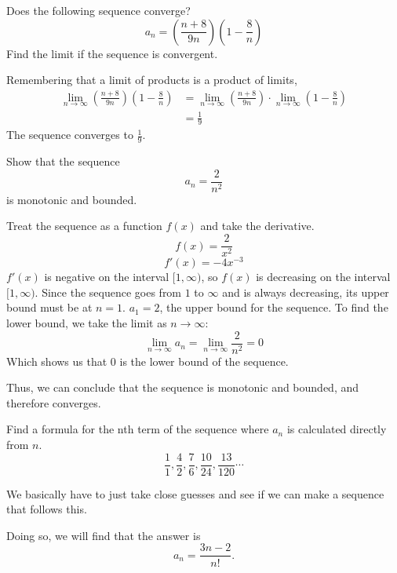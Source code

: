 \begin{ex}
  Does the following sequence converge?
  \[ a_n = \left( \frac{n+8}{9n} \right) \left( 1-\frac{8}{n} \right) \]
  Find the limit if the sequence is convergent.
  \begin{sol}
    Remembering that a limit of products is a product of limits,
    \begin{align*}
      \lim_{n \to \infty} \left( \frac{n+8}{9n} \right) \left( 1-\frac{8}{n} \right)
      &= \lim_{n \to \infty} \left( \frac{n+8}{9n} \right) \cdot
      \lim_{n \to \infty} \left( 1-\frac{8}{n} \right)\\
      &= \frac{1}{9}
    \end{align*}
    The sequence converges to \(\frac{1}{9} \).
  \end{sol}
\end{ex}
\begin{ex}
  Show that the sequence \[a_n = \frac{2}{n^2} \] is monotonic and bounded.
  \begin{sol}
    Treat the sequence as a function $f(x)$ and take the derivative.
    \[ f(x) = \frac{2}{x^2} \]
    \[ f'(x) = -4 x^{-3} \]
    $f'(x)$ is negative on the interval $[1, \infty)$, so $f(x)$ is decreasing
      on the interval $[1, \infty)$. Since the sequence goes from $1$ to
        $\infty$ and is always decreasing, its upper bound must be at $n=1$.
        $a_1=2$, the upper bound for the sequence. To find the lower bound, we
        take the limit as $n \to \infty$:
        \[ \lim_{n \to \infty} a_n = \lim_{n \to \infty} \frac{2}{n^2} = 0 \]
        Which shows us that $0$ is the lower bound of the sequence.

        Thus, we can conclude that the sequence is monotonic and bounded, and therefore converges.
  \end{sol}
\end{ex}
\begin{ex}
  Find a formula for the nth term of the sequence where \(a_n\) is calculated
  directly from \(n\).
  \[ \frac{1}{1}, \frac{4}{2}, \frac{7}{6}, \frac{10}{24}, \frac{13}{120} \cdots \]
  \begin{sol}
    We basically have to just take close guesses and see if we can make a sequence that follows this.

    Doing so, we will find that the answer is
    \[ a_n = \frac{3n-2}{n!}.\]
  \end{sol}
\end{ex}

%
%
